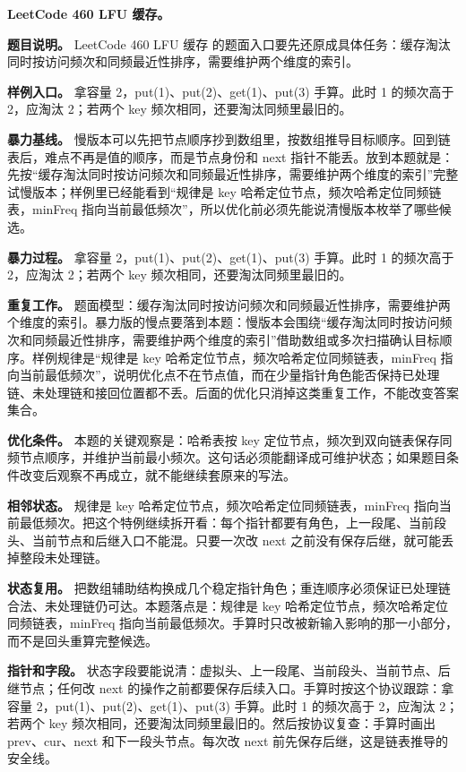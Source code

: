 \noindent\textbf{LeetCode 460 LFU 缓存。}

\textbf{题目说明。} LeetCode 460 LFU 缓存 的题面入口要先还原成具体任务：缓存淘汰同时按访问频次和同频最近性排序，需要维护两个维度的索引。

\textbf{样例入口。} 拿容量 2，put(1)、put(2)、get(1)、put(3) 手算。此时 1 的频次高于 2，应淘汰 2；若两个 key 频次相同，还要淘汰同频里最旧的。

\textbf{暴力基线。} 慢版本可以先把节点顺序抄到数组里，按数组推导目标顺序。回到链表后，难点不再是值的顺序，而是节点身份和 next 指针不能丢。放到本题就是：先按“缓存淘汰同时按访问频次和同频最近性排序，需要维护两个维度的索引”完整试慢版本；样例里已经能看到“规律是 key 哈希定位节点，频次哈希定位同频链表，minFreq 指向当前最低频次”，所以优化前必须先能说清慢版本枚举了哪些候选。

\textbf{暴力过程。} 拿容量 2，put(1)、put(2)、get(1)、put(3) 手算。此时 1 的频次高于 2，应淘汰 2；若两个 key 频次相同，还要淘汰同频里最旧的。

\textbf{重复工作。} 题面模型：缓存淘汰同时按访问频次和同频最近性排序，需要维护两个维度的索引。暴力版的慢点要落到本题：慢版本会围绕“缓存淘汰同时按访问频次和同频最近性排序，需要维护两个维度的索引”借助数组或多次扫描确认目标顺序。样例规律是“规律是 key 哈希定位节点，频次哈希定位同频链表，minFreq 指向当前最低频次”，说明优化点不在节点值，而在少量指针角色能否保持已处理链、未处理链和接回位置都不丢。后面的优化只消掉这类重复工作，不能改变答案集合。

\textbf{优化条件。} 本题的关键观察是：哈希表按 key 定位节点，频次到双向链表保存同频节点顺序，并维护当前最小频次。这句话必须能翻译成可维护状态；如果题目条件改变后观察不再成立，就不能继续套原来的写法。

\textbf{相邻状态。} 规律是 key 哈希定位节点，频次哈希定位同频链表，minFreq 指向当前最低频次。把这个特例继续拆开看：每个指针都要有角色，上一段尾、当前段头、当前节点和后继入口不能混。只要一次改 next 之前没有保存后继，就可能丢掉整段未处理链。

\textbf{状态复用。} 把数组辅助结构换成几个稳定指针角色；重连顺序必须保证已处理链合法、未处理链仍可达。本题落点是：规律是 key 哈希定位节点，频次哈希定位同频链表，minFreq 指向当前最低频次。手算时只改被新输入影响的那一小部分，而不是回头重算完整候选。

\textbf{指针和字段。} 状态字段要能说清：虚拟头、上一段尾、当前段头、当前节点、后继节点；任何改 next 的操作之前都要保存后续入口。手算时按这个协议跟踪：拿容量 2，put(1)、put(2)、get(1)、put(3) 手算。此时 1 的频次高于 2，应淘汰 2；若两个 key 频次相同，还要淘汰同频里最旧的。然后按协议复查：手算时画出 prev、cur、next 和下一段头节点。每次改 next 前先保存后继，这是链表推导的安全线。

